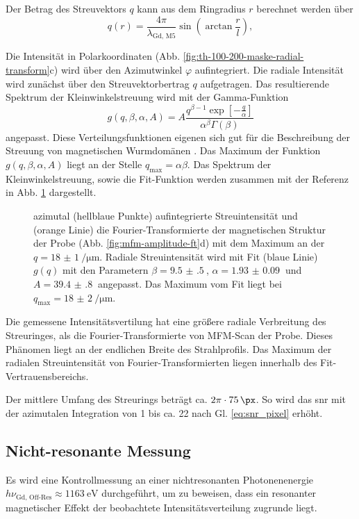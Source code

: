 \noindent
Der Betrag des Streuvektors $q$ kann aus dem Ringradius $r$ berechnet werden über
\begin{equation}
    q(r) = \frac{4\pi}{\lambda_\text{Gd, M5}}\sin\left(\arctan\frac{r}{l}\right),
    \label{eq:streuvektor_von_radius}
\end{equation}

\noindent
Die Intensität in Polarkoordinaten (Abb. \ref{fig:th-100-200-maske-radial-transform}c) wird über den Azimutwinkel $\varphi$ aufintegriert. Die radiale Intensität wird zunächst über den Streuvektorbertrag $q$  aufgetragen. Das resultierende Spektrum der Kleinwinkelstreuung wird mit der Gamma-Funktion
\begin{equation}
    g(q, \beta, \alpha, A) = A\frac{q^{\beta-1}\exp\left[-\frac{q}{\alpha}\right]}{\alpha^\beta\Gamma(\beta)}
\end{equation}
angepasst. Diese Verteilungsfunktionen eigenen sich gut für die Beschreibung der Streuung von magnetischen Wurmdomänen \cite{bagschik_employing_2016}. Das Maximum der Funktion $g(q, \beta, \alpha, A)$ liegt an der Stelle $q_\text{max} = \alpha\beta$. Das Spektrum der Kleinwinkelstreuung, sowie die Fit-Funktion werden zusammen mit der Referenz in Abb. \ref{fig:radius_fit} dargestellt.
\begin{figure}[H]
    \centering
    
    \caption{azimutal (hellblaue Punkte) aufintegrierte Streuintensität und (orange Linie) die Fourier-Transformierte der magnetischen Struktur der Probe (Abb. \ref{fig:mfm-amplitude-ft}d) mit dem Maximum an der $q =\SI{18(1)}{\per\micro\meter}$. Radiale Streuintensität wird mit Fit (blaue Linie) $g(q)$ mit den Parametern $\beta = \SI{9.5(5)}{}$, $\alpha = \SI{1.93(9)}{}$ und $A = \SI{39.4(8)}{}$ angepasst. Das Maximum vom Fit liegt bei $q_\text{max} = \SI{18(2)}{\per\micro\meter}$.}
    \label{fig:radius_fit}
\end{figure}
\noindent
Die gemessene Intensitätsvertilung hat eine größere radiale Verbreitung des Streuringes, als die Fourier-Transformierte von MFM-Scan der Probe. Dieses Phänomen liegt an der endlichen Breite des Strahlprofils. Das Maximum der radialen Streuintensität von Fourier-Transformierten liegen innerhalb des Fit-Vertrauensbereichs.

\noindent
Der mittlere Umfang des Streurings beträgt ca. $2\pi\cdot\SI{75}{\px}$. So wird das \gls{snr} mit der azimutalen Integration von 1 bis ca. 22 nach Gl. \ref{eq:snr_pixel} erhöht.

\subsection{Nicht-resonante Messung}
Es wird eine Kontrollmessung an einer nichtresonanten Photonenenergie $h\nu_{\text{Gd, Off-Res}} \approx \SI{1163}{\eV}$ durchgeführt, um zu beweisen, dass ein resonanter magnetischer Effekt der beobachtete Intensitätsverteilung zugrunde liegt.

